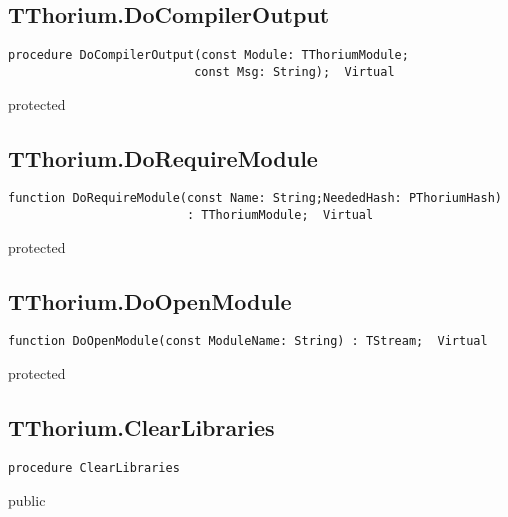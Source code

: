 \subsection{TThorium.DoCompilerOutput}
\label{thoriumcore:thorium:tthorium:docompileroutput}
\begin{FPCList}
\Synopsis
\Declaration 

\begin{verbatim}
procedure DoCompilerOutput(const Module: TThoriumModule;
                          const Msg: String);  Virtual
\end{verbatim}
\Visibility
protected
\Description
\Errors
\end{FPCList}
\subsection{TThorium.DoRequireModule}
\label{thoriumcore:thorium:tthorium:dorequiremodule}
\begin{FPCList}
\Synopsis
\Declaration 

\begin{verbatim}
function DoRequireModule(const Name: String;NeededHash: PThoriumHash)
                         : TThoriumModule;  Virtual
\end{verbatim}
\Visibility
protected
\Description
\Errors
\end{FPCList}
\subsection{TThorium.DoOpenModule}
\label{thoriumcore:thorium:tthorium:doopenmodule}
\begin{FPCList}
\Synopsis
\Declaration 

\begin{verbatim}
function DoOpenModule(const ModuleName: String) : TStream;  Virtual
\end{verbatim}
\Visibility
protected
\Description
\Errors
\end{FPCList}
\subsection{TThorium.ClearLibraries}
\label{thoriumcore:thorium:tthorium:clearlibraries}
\begin{FPCList}
\Synopsis
\Declaration 

\begin{verbatim}
procedure ClearLibraries
\end{verbatim}
\Visibility
public
\Description
\Errors
\end{FPCList}

